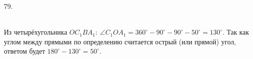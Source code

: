 79. \begin{figure}[ht!]
\end{figure}\\
Из четырёхугольника $OC_1BA_1:\ \angle C_1OA_1=360^\circ-90^\circ-90^\circ-50^\circ=130^\circ.$ Так как углом между прямыми по определению считается острый (или прямой) угол, ответом будет $180^\circ-130^\circ=50^\circ.$\\
